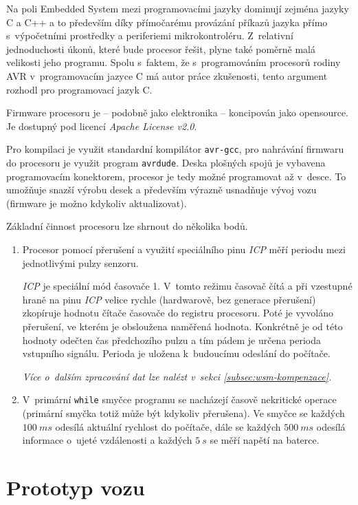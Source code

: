 Na poli Embedded System mezi programovacími jazyky dominují zejména jazyky C a
C++ a to především díky přímočarému provázání příkazů jazyka přímo
s~výpočetními prostředky a periferiemi mikrokontroléru. Z~relativní
jednoduchosti úkonů, které bude procesor řešit, plyne také poměrně malá
velikosti jeho programu. Spolu s~faktem, že s~programováním procesorů rodiny
AVR v~programovacím jazyce C má autor práce zkušenosti, tento argument rozhodl
pro programovací jazyk C.

Firmware procesoru je -- podobně jako elektronika -- koncipován jako
opensource. Je dostupný \cite{wsm-fw} pod licencí \textit{Apache License v2.0}.

Pro kompilaci je využit standardní kompilátor \texttt{avr-gcc}, pro nahrávání
firmwaru do procesoru je využit program \texttt{avrdude}. Deska
plošných spojů je vybavena programovacím konektorem, procesor je tedy možné
programovat až v~desce. To umožňuje snazší výrobu desek a především výrazně
usnadňuje vývoj vozu (firmware je možno kdykoliv aktualizovat).

Základní činnost procesoru lze shrnout do několika bodů.

\begin{enumerate}
\item Procesor pomocí přerušení a využití speciálního pinu \textit{ICP}
měří periodu mezi jednotlivými pulzy senzoru.

\textit{ICP} je speciální mód časovače 1. V~tomto režimu časovač čítá a při
vzestupné hraně na pinu \textit{ICP} velice rychle (hardwarově, bez generace
přerušení) zkopíruje hodnotu čítače časovače do registru procesoru. Poté je
vyvoláno přerušení, ve kterém je obsloužena naměřená hodnota. Konkrétně je od
této hodnoty odečten čas předchozího pulzu a tím pádem je určena perioda
vstupního signálu. Perioda je uložena k~budoucímu odeslání do počítače.

\textit{Více o~dalším zpracování dat lze nalézt v~sekci
\ref{subsec:wsm-kompenzace}.}

\item V~primární \texttt{while} smyčce programu se nacházejí časově nekritické
operace (primární smyčka totiž může být kdykoliv přerušena). Ve
smyčce se každých $100\ ms$ odesílá aktuální rychlost do počítače, dále se každých
$500\ ms$ odesílá informace o~ujeté vzdálenosti a každých $5\ s$ se měří napětí
na baterce.

\end{enumerate}

\section{Prototyp vozu}
\label{sec:wsm-prototype}

